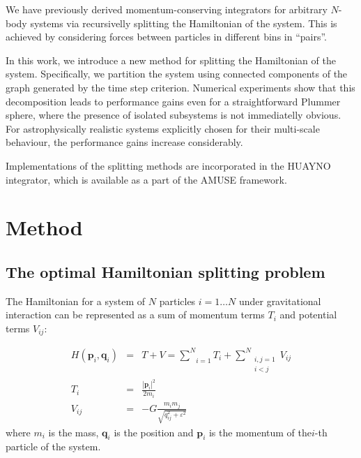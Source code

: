 \documentclass[referee]{aa}
\begin{document}
We have previously derived momentum-conserving integrators for arbitrary $N$-body systems via recursivelly splitting the Hamiltonian of the system.\cite{Pelupessy:2012if} This is achieved by considering forces between particles in different bins in ``pairs''.

In this work, we introduce a new method for splitting the Hamiltonian of the system. Specifically, we partition the system using connected components of the graph generated by the time step criterion. Numerical experiments show that this decomposition leads to performance gains even for a straightforward Plummer sphere, where the presence of isolated subsystems is not immediatelly obvious. For astrophysically realistic systems explicitly chosen for their multi-scale behaviour, the performance gains increase considerably.

Implementations of the splitting methods are incorporated in the HUAYNO integrator, which is available as a part of the AMUSE framework.\cite{Pelupessy:2013tv}

\section{Method}

\subsection{The optimal Hamiltonian splitting problem}

The Hamiltonian for a system of $N$ particles $i=1\ldots N$ under
gravitational interaction can be represented as a sum of momentum
terms $T_{i}$ and potential terms $V_{ij}$:

\begin{eqnarray*}
H(\mathbf{p}_{i},\mathbf{q}_{i}) & = & T+V=\underset{i=1}{\overset{N}{\sum}}T_{i}+\underset{\substack{i,j=1\\
i<j
}
}{\overset{N}{\sum}}V_{ij}\\
T_{i} & = & \frac{\left|\mathbf{p}_{i}\right|^{2}}{2m_{i}}\\
V_{ij} & = & -G\frac{m_{i}m_{j}}{\sqrt{q_{ij}^{2}+\varepsilon^{2}}}
\end{eqnarray*}
where $m_{i}$ is the mass, $\mathbf{q}_{i}$ is the position and
$\mathbf{p}_{i}$ is the momentum of the$i$-th particle of the system.
\end{document}

